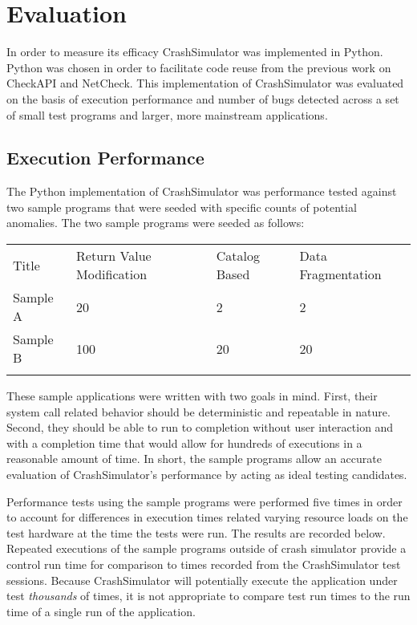\section{Evaluation}

    In order to measure its efficacy CrashSimulator was implemented in Python. Python was chosen in order to facilitate
    code reuse from the previous work on CheckAPI and NetCheck. This implementation of CrashSimulator was evaluated on
    the basis of execution performance and number of bugs detected across a set of small test programs and larger, more
    mainstream applications.

    \subsection{Execution Performance}

        The Python implementation of CrashSimulator was performance tested against two sample programs that were seeded
        with specific counts of potential anomalies. The two sample programs were seeded as follows:

        \begin{tabular}{l | l | l | l}
            \hline{}
                Title & Return Value Modification & Catalog Based & Data Fragmentation \\
                Sample A & 20 & 2 & 2 \\
                Sample B & 100 & 20 & 20 \\
            \hline{}
        \end{tabular}

        These sample applications were written with two goals in mind. First, their system call related behavior should
        be deterministic and repeatable in nature. Second, they should be able to run to completion without user
        interaction and with a completion time that would allow for hundreds of executions in a reasonable amount of
        time. In short, the sample programs allow an accurate evaluation of CrashSimulator's performance by acting as
        ideal testing candidates.

        Performance tests using the sample programs were performed five times in order to account for differences in
        execution times related varying resource loads on the test hardware at the time the tests were run. The results
        are recorded below. Repeated executions of the sample programs outside of crash simulator provide a control run
        time for comparison to times recorded from the CrashSimulator test sessions. Because CrashSimulator will
        potentially execute the application under test \emph{thousands} of times, it is not appropriate to compare test
        run times to the run time of a single run of the application.

